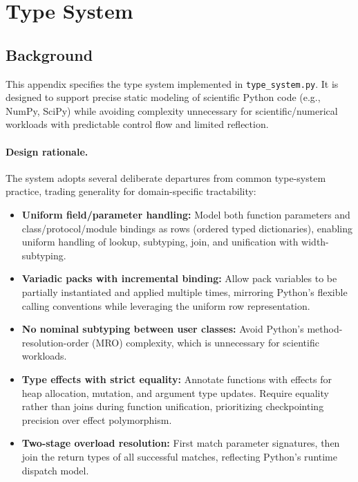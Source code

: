 \section{Type System}
\label{appendix:typesystem}
\subsection{Background}
This appendix specifies the type system implemented in \texttt{type\_system.py}.  
It is designed to support precise static modeling of scientific Python code (e.g., NumPy, SciPy) while avoiding complexity unnecessary for scientific/numerical workloads with predictable control flow and limited reflection.
\paragraph{Design rationale.}
The system adopts several deliberate departures from common type-system practice, trading generality for domain-specific tractability:
\begin{itemize}
  \item \textbf{Uniform field/parameter handling:} Model both function parameters and class/protocol/module bindings as rows (ordered typed dictionaries), enabling uniform handling of lookup, subtyping, join, and unification with width-subtyping.
  \item \textbf{Variadic packs with incremental binding:} Allow pack variables to be partially instantiated and applied multiple times, mirroring Python's flexible calling conventions while leveraging the uniform row representation.
  \item \textbf{No nominal subtyping between user classes:} Avoid Python's method-resolution-order (MRO) complexity, which is unnecessary for scientific workloads.
  \item \textbf{Type effects with strict equality:} Annotate functions with effects for heap allocation, mutation, and argument type updates. Require equality rather than joins during function unification, prioritizing checkpointing precision over effect polymorphism.
  \item \textbf{Two-stage overload resolution:} First match parameter signatures, then join the return types of all successful matches, reflecting Python's runtime dispatch model.
\end{itemize}
